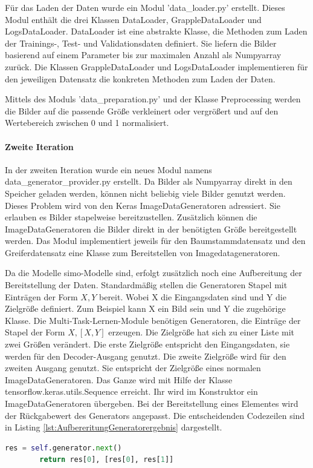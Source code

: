 	Für das Laden der Daten wurde ein Modul 'data\_loader.py' erstellt. Dieses Modul enthält die drei Klassen DataLoader, GrappleDataLoader und LogsDataLoader. DataLoader ist eine abstrakte Klasse, die Methoden zum Laden der Trainings-, Test- und Validationsdaten definiert. 
	Sie liefern die Bilder basierend auf einem Parameter bis zur maximalen Anzahl als Numpyarray zurück. Die Klassen GrappleDataLoader und LogsDataLoader implementieren für den jeweiligen Datensatz die konkreten Methoden zum Laden der Daten.
	
	Mittels des Moduls 'data\_preparation.py' und der Klasse Preprocessing werden die Bilder auf die passende Größe verkleinert oder vergrößert und auf den Wertebereich zwischen 0 und 1 normalisiert.
	
	\paragraph{Zweite Iteration} 
	In der zweiten Iteration wurde ein neues Modul namens \\ data\_generator\_provider.py erstellt. Da Bilder als Numpyarray direkt in den Speicher geladen werden, können nicht beliebig viele Bilder genutzt werden. Dieses Problem wird von den Keras ImageDataGeneratoren \cite{Chollet.2015} adressiert. Sie erlauben es Bilder stapelweise bereitzustellen. Zusätzlich können die ImageDataGeneratoren die Bilder direkt in der benötigten Größe bereitgestellt werden. Das Modul implementiert jeweils für den Baumstammdatensatz und den Greiferdatensatz eine Klasse zum Bereitstellen von Imagedatageneratoren.
	
	Da die Modelle \ac{simo}-Modelle sind, erfolgt zusätzlich noch eine Aufbereitung der Bereitstellung der Daten. Standardmäßig stellen die Generatoren Stapel mit Einträgen der Form $X ,Y$  bereit. Wobei X die Eingangsdaten sind und Y die Zielgröße definiert. Zum Beispiel kann X ein Bild sein und Y die zugehörige Klasse. Die Multi-Task-Lernen-Module benötigen Generatoren, die Einträge der Stapel der Form $X, [X, Y]$ erzeugen. Die Zielgröße hat sich zu einer Liste mit zwei Größen verändert. Die erste Zielgröße entspricht den Eingangsdaten, sie werden für den Decoder-Ausgang genutzt. Die zweite Zielgröße wird für den zweiten Ausgang genutzt. Sie entspricht der Zielgröße eines normalen ImageDataGeneratoren. Das Ganze wird mit Hilfe der Klasse tensorflow.keras.utils.Sequence erreicht. Ihr wird im Konstruktor ein ImageDataGeneratoren übergeben. Bei der Bereitstellung eines Elementes wird der Rückgabewert des Generators angepasst. Die entscheidenden Codezeilen sind in Listing \ref{lst:AufbereritungGeneratorergebnis} dargestellt. 
	\begin{lstlisting}[language=python,caption=Aufbereitung Generatorergebnis in Python, label=lst:AufbereritungGeneratorergebnis]
		res = self.generator.next()
		return res[0], [res[0], res[1]]
	\end{lstlisting}
	
